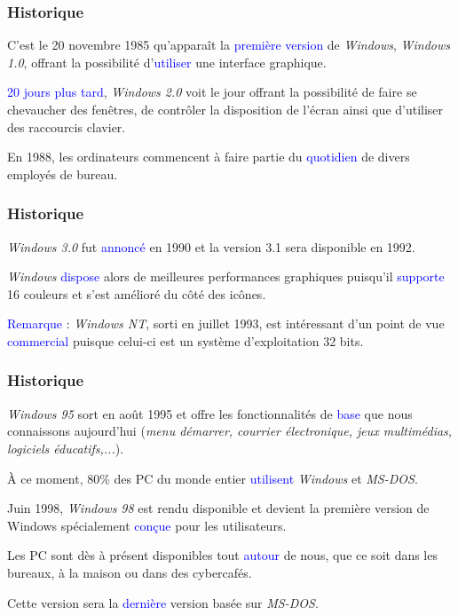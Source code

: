 \documentclass[aspectratio=169]{beamer}
\begin{document}
\begin{frame}
  \frametitle{Historique}
  C'est le 20 novembre 1985 qu'apparaît la \textcolor{blue}{première version} de
  \textit{Windows}, \textit{Windows 1.0}, offrant la possibilité
  d'\textcolor{blue}{utiliser} une interface graphique.

  \hspace{0.5cm}

  \textcolor{blue}{20 jours plus tard}, \textit{Windows 2.0} voit le jour offrant la
  possibilité de faire se chevaucher des fenêtres, de contrôler la disposition
  de l'écran ainsi que d'utiliser des raccourcis clavier.

  \hspace{0.5cm}

    En 1988, les ordinateurs commencent à faire partie du
  \textcolor{blue}{quotidien} de divers employés de bureau.
\end{frame}

\begin{frame}
  \frametitle{Historique}
  \textit{Windows 3.0} fut \textcolor{blue}{annoncé} en 1990 et la version 3.1
  sera disponible en 1992.

  \hspace{0.5cm}

  \textit{Windows} \textcolor{blue}{dispose} alors de meilleures performances graphiques
  puisqu'il \textcolor{blue}{supporte} 16 couleurs et s'est amélioré du
  côté des icônes.

  \hspace{0.5cm}

  \textcolor{blue}{Remarque} : \textit{Windows NT}, sorti en juillet 1993, est
  intéressant d'un point de vue \textcolor{blue}{commercial} puisque celui-ci
  est un système d'exploitation 32 bits.
\end{frame}

\begin{frame}
  \frametitle{Historique}
  \textit{Windows 95} sort en août 1995 et offre les fonctionnalités de
  \textcolor{blue}{base} que nous connaissons aujourd'hui (\textit{menu
  démarrer, courrier électronique, jeux multimédias, logiciels éducatifs,...}).

  \hspace{0.5cm}

  À ce moment, 80\% des PC du monde entier \textcolor{blue}{utilisent} \textit{Windows}
  et \textit{MS-DOS}.

  \hspace{0.5cm}

  Juin 1998, \textit{Windows 98} est rendu disponible et devient la première
  version de Windows spécialement \textcolor{blue}{conçue} pour les utilisateurs.

  \hspace{0.5cm}

  Les PC sont dès à présent disponibles tout \textcolor{blue}{autour} de nous,
  que ce soit dans les bureaux, à la maison ou dans des cybercafés.

  \hspace{0.5cm}

  Cette version sera la \textcolor{blue}{dernière} version basée sur \textit{MS-DOS}.
\end{frame}
\end{document}
